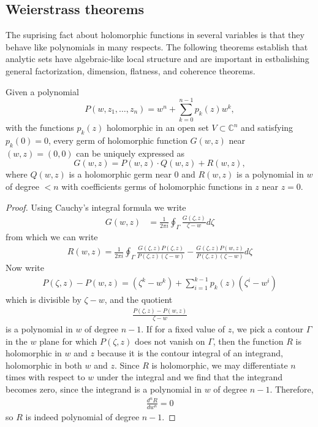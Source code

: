 \documentclass[12pt]{article}
\begin{document}
\subsection{Weierstrass theorems}
The suprising fact about holomorphic functions in several variables is that they behave like polynomials in many respects. The following theorems establish that analytic sets have algebraic-like local structure and are important in estbalishing general factorization, dimension, flatness, and coherence theorems.

\begin{theorem}
Given a polynomial
\[
    P(w,z_1,\dots,z_n) = w^n + \sum_{k=0}^{n-1} p_k(z) w^k,
\]
with the functions $p_k(z)$ holomorphic in an open set $V \subset \mathbb{C}^n$ and satisfying $p_k(0)=0$, every germ of holomorphic function $G(w,z)$ near $(w,z)=(0,0)$ can be uniquely expressed as
\[
    G(w,z) = P(w,z)\cdot Q(w,z) + R(w,z),
\]
where $Q(w,z)$ is a holomorphic germ near $0$ and $R(w,z)$ is a polynomial in $w$ of degree $< n$ with coefficients germs of holomorphic functions in $z$ near $z=0$.
\end{theorem}


\begin{proof}
    Using Cauchy's integral formula we write \begin{align*}
        G(w,z) & = \frac{1}{2\pi i}\oint_{\Gamma} \frac{G(\zeta, z)}{\zeta - w} d\zeta
    \end{align*}
    from which we can write \begin{align*}
        R(w,z) = \frac{1}{2\pi i}\oint_{\Gamma}  \frac{G(\zeta, z)P(\zeta,z)}{P(\zeta,z)(\zeta - w)} - \frac{G(\zeta,z)P(w,z)}{P(\zeta,z)(\zeta - w)} d\zeta
    \end{align*}
    Now write \begin{align*}
        P(\zeta,z) - P(w,z) = (\zeta^k - w^k) + \sum_{i=1}^{k-1} p_k(z)(\zeta^i - w^i)
    \end{align*} which is divisible by $\zeta - w$, and the quotient \begin{align*}
        \frac{P(\zeta,z) - P(w,z)}{\zeta - w}
    \end{align*} is a polynomial in $w$ of degree $n-1$. If for a fixed value of $z$, we pick a contour $\Gamma$ in the $w$ plane for which $P(\zeta,z)$ does not vanish on $\Gamma$, then the function $R$ is holomorphic in $w$ and $z$ because it is the contour integral of an integrand, holomorphic in both $w$ and $z$. Since $R$ is holomorphic, we may differentiate $n$ times with respect to $w$ under the integral and we find that the integrand becomes zero, since the integrand is a polynomial in $w$ of degree $n-1$. Therefore, \begin{align*}
        \frac{d^nR}{dw^n} = 0
    \end{align*} so $R$ is indeed polynomial of degree $n-1$.
\end{proof} 
\end{document}
